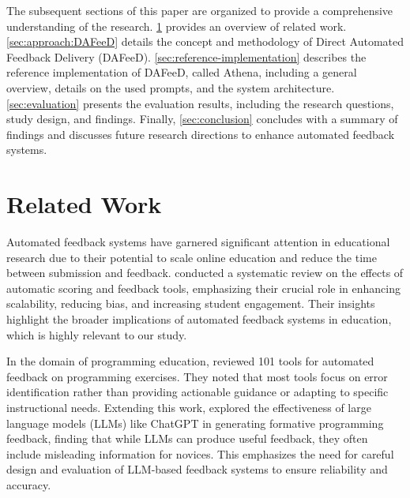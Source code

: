 \documentclass[manuscript,screen,review]{acmart}
\begin{document}
The subsequent sections of this paper are organized to provide a comprehensive understanding of the research. 
\cref{sec:related-work} provides an overview of related work. 
\cref{sec:approach:DAFeeD} details the concept and methodology of Direct Automated Feedback Delivery (DAFeeD).
\cref{sec:reference-implementation} describes the reference implementation of DAFeeD, called Athena, including a general overview, details on the used prompts, and the system architecture. 
\cref{sec:evaluation} presents the evaluation results, including the research questions, study design, and findings. 
Finally, \cref{sec:conclusion} concludes with a summary of findings and discusses future research directions to enhance automated feedback systems.

\section{Related Work} %
\label{sec:related-work}


Automated feedback systems have garnered significant attention in educational research due to their potential to scale online education and reduce the time between submission and feedback. \citet{hahn:2021:SystematicReviewEffects} conducted a systematic review on the effects of automatic scoring and feedback tools, emphasizing their crucial role in enhancing scalability, reducing bias, and increasing student engagement. Their insights highlight the broader implications of automated feedback systems in education, which is highly relevant to our study.


%
In the domain of programming education, \citet{keuning:2018:SystematicLiteratureReview} reviewed 101 tools for automated feedback on programming exercises. They noted that most tools focus on error identification rather than providing actionable guidance or adapting to specific instructional needs. Extending this work, \citet{kiesler:2023:ExploringPotentialLarge} explored the effectiveness of large language models (LLMs) like ChatGPT in generating formative programming feedback, finding that while LLMs can produce useful feedback, they often include misleading information for novices. This emphasizes the need for careful design and evaluation of LLM-based feedback systems to ensure reliability and accuracy.
\end{document}
